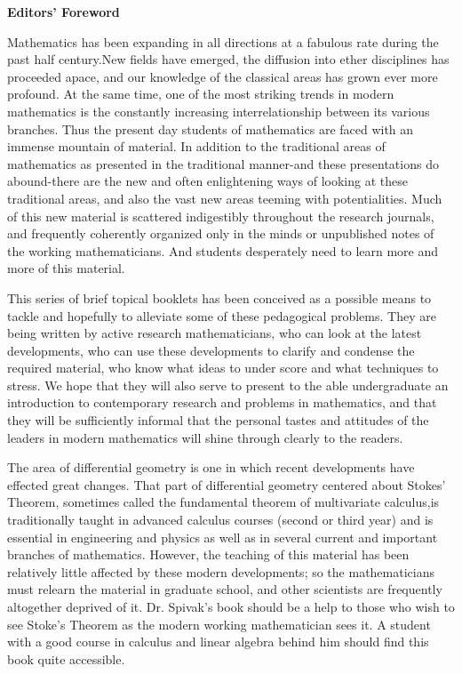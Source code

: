 \thispagestyle{empty}
\vspace*{4em}
\begin{center}
    {\bfseries\Huge Editors' Foreword}
    \label{Foreword}
\end{center}
\vspace*{5em}
    Mathematics has been expanding in all directions at a fabulous
rate during the past half century.New fields have emerged,
the diffusion into ether disciplines has proceeded apace, and
our knowledge of the classical areas has grown ever more profound. 
At the same time, one of the most striking trends in
modern mathematics is the constantly increasing interrelationship 
between its various branches. Thus the present day
students of mathematics are faced with an immense mountain
of material. In addition to the traditional areas of mathematics 
as presented in the traditional manner-and these
presentations do abound-there are the new and often enlightening 
ways of looking at these traditional areas, and also
the vast new areas teeming with potentialities. Much of this
new material is scattered indigestibly throughout the research
journals, and frequently coherently organized only in the
minds or unpublished notes of the working mathematicians.
And students desperately need to learn more and more of this
material.

    This series of brief topical booklets has been conceived as a
possible means to tackle and hopefully to alleviate some of 
these pedagogical problems. They are being written by active
research mathematicians, who can look at the latest developments, 
who can use these developments to clarify and condense the required material, 
who know what ideas to under score and what techniques to stress. We hope that they will
also serve to present to the able undergraduate an introduction
to contemporary research and problems in mathematics, and
that they will be sufficiently informal that the personal tastes
and attitudes of the leaders in modern mathematics will shine
through clearly to the readers. 

The area of differential geometry is one in which recent developments 
have effected great changes. That part of differential geometry centered 
about Stokes' Theorem, sometimes called the fundamental theorem of multivariate 
calculus,is traditionally taught in advanced calculus courses (second or
third year) and is essential in engineering and physics as well
as in several current and important branches of mathematics.
However, the teaching of this material has been relatively
little affected by these modern developments; so the mathematicians 
must relearn the material in graduate school, and
other scientists are frequently altogether deprived of it. Dr.
Spivak's book should be a help to those who wish to see
Stoke's Theorem as the modern working mathematician sees
it. A student with a good course in calculus and linear 
algebra behind him should find this book quite accessible.

